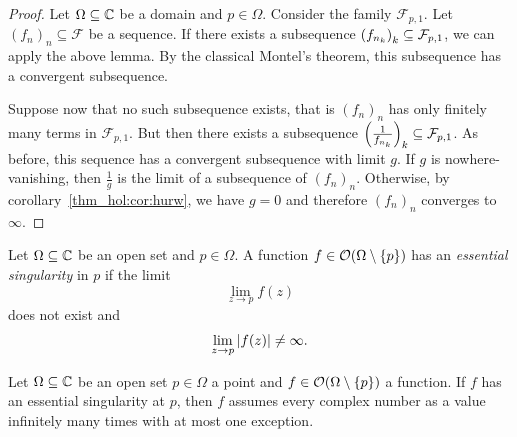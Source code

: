 \begin{proof}
Let $\Omega \subseteq \mathbb{C}$ be a domain and $p \in \Omega$. Consider
the family $\mathcal{F}_{p,1}$. Let $(f_n)_n \subseteq \mathcal{F}$
be a sequence. If there exists a subsequence
$\left(f_{n_k}\right)_k \subseteq \mathcal{F}_{p,1}$, we can apply the
above lemma. By the classical Montel's theorem, this subsequence
has a convergent subsequence.

Suppose now that no such subsequence exists, that is $(f_n)_n$ has
only finitely many terms in $\mathcal{F}_{p,1}$. But then there
exists a subsequence
$\left(\frac{1}{f_{n_k}}\right)_k \subseteq \mathcal{F}_{p,1}$. As before,
this sequence has a convergent subsequence with limit $g$. If $g$
is nowhere-vanishing, then $\frac{1}{g}$ is the limit of a
subsequence of $(f_n)_n$. Otherwise, by
corollary~\ref{thm_hol:cor:hurw}, we have $g = 0$ and therefore
$(f_n)_n$ converges to $\infty$.
\end{proof}

\begin{definicija}
Let $\Omega \subseteq \mathbb{C}$ be an open set and $p \in \Omega$. A
function $f \in \mathcal{O}(\Omega \setminus \left\{p\right\})$ has an
\emph{essential singularity} in $p$ if
the limit
\[
\lim_{z \to p} f(z)
\]
does not exist and
\[
\lim_{z \to p} \left\lvert f(z)\right\rvert \ne \infty.
\]
\end{definicija}

\begin{izrek}
Let $\Omega \subseteq \mathbb{C}$ be an open set $p \in \Omega$ a point and
$f \in \mathcal{O}(\Omega \setminus \left\{p\right\})$ a function. If $f$
has an essential singularity at $p$, then $f$ assumes every complex
number as a value infinitely many times with at most one exception.
\end{izrek}

